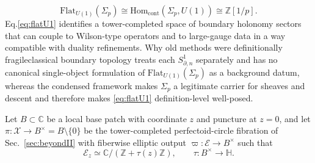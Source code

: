 \documentclass[11pt]{article}
\theoremstyle{remark}
\newcommand{\C}{\mathbb{C}}
\newcommand{\Z}{\mathbb{Z}}
\begin{document}
\begin{equation}\label{eq:flatU1}
\mathrm{Flat}_{U(1)}(\Sigma_{p})\cong \mathrm{Hom}_{\mathrm{cont}}(\Sigma_{p},U(1))\cong \Z[1/p].
\end{equation}
Eq.\eqref{eq:flatU1} identifies a tower-completed space of boundary holonomy sectors that can couple to Wilson-type operators and to large-gauge data in a way compatible with duality refinements. Why old methods were definitionally fragile\:classical boundary topology treats each \(S^{1}_{\partial,n}\) separately and has no canonical single-object formulation of \(\mathrm{Flat}_{U(1)}(\Sigma_{p})\) as a background datum, whereas the condensed framework makes \(\Sigma_{p}\) a legitimate carrier for sheaves and descent and therefore makes \eqref{eq:flatU1} definition-level well-posed.

Let \(B\subset \C\) be a local base patch with coordinate \(z\) and puncture at \(z=0\), and let \(\pi:\mathcal{X}\to B^{\times}=B\setminus\{0\}\) be the tower-completed perfectoid-circle fibration of Sec.~\ref{sec:beyondII} with fiberwise elliptic output \(\varpi:\mathcal{E}\to B^{\times}\) such that
\begin{equation}\label{eq:E-tau-local}
\mathcal{E}_{z} \simeq \mathbb{C}/(\mathbb{Z} + \tau(z)\mathbb{Z}),
\qquad
\tau  : B^{\times} \to \mathbb{H}.
\end{equation}
\end{document}
